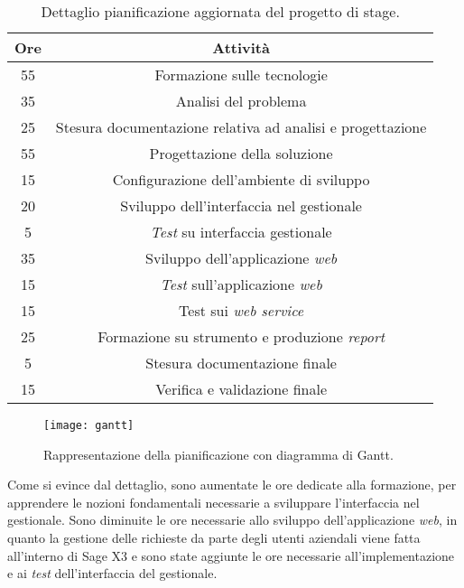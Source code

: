 \begin{center}
	\begin{longtable}{ | c| c|}
		\caption{Dettaglio pianificazione aggiornata del progetto di stage.}\\	
		\hline
		\textbf{Ore} & \textbf{Attività}\\
		\hline
		55 & Formazione sulle tecnologie\\
		\hline
		35 & Analisi del problema\\
		\hline
		25 & Stesura documentazione relativa ad analisi e progettazione\\
		\hline
		55 & Progettazione della soluzione\\
		\hline
		15 & Configurazione dell'ambiente di sviluppo\\
		\hline
		20 & Sviluppo dell'interfaccia nel gestionale\\
		\hline
		5 & \textit{Test} su interfaccia gestionale\\
		\hline
		35 & Sviluppo dell'applicazione \textit{web}\\
		\hline
		15 & \textit{Test} sull'applicazione \textit{web}\\
		\hline
		15 & Test sui \textit{web service}\\
		\hline
		25 & Formazione su strumento e produzione \textit{report}\\
		\hline
		5 & Stesura documentazione finale\\
		\hline
		15 & Verifica e validazione finale\\
		\hline
	\end{longtable}
\end{center}

\begin{figure}[htbp]
	\begin{center}
		\texttt{[image: gantt]}
		\caption{Rappresentazione della pianificazione con diagramma di Gantt.}
	\end{center}
\end{figure}

Come si evince dal dettaglio, sono aumentate le ore dedicate alla formazione, per apprendere le nozioni fondamentali necessarie a sviluppare l'interfaccia nel gestionale. Sono diminuite le ore necessarie allo sviluppo dell'applicazione \textit{web}, in quanto la gestione delle richieste da parte degli utenti aziendali viene fatta all'interno di Sage X3 e sono state aggiunte le ore necessarie all'implementazione e ai \textit{test} dell'interfaccia del gestionale.

